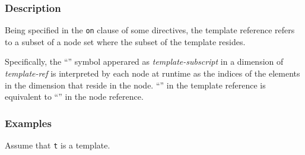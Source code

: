 \subsubsection*{Description}

Being specified in the {\tt on} clause of some directives, the template
reference refers to a subset of a node set where the subset of the
template resides.

Specifically, the ``{\tt *}'' symbol apperared as {\it
template-subscript} in a dimension of {\it template-ref} is interpreted
by each node at runtime as the indices of the elements in the dimension
that reside in the node. ``{\tt *}'' in the template reference is
equivalent to ``{\tt *}'' in the node reference.
%


\subsubsection*{Examples}

Assume that {\tt t} is a template.

